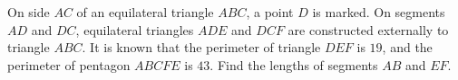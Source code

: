 On side $AC$ of an equilateral triangle $ABC$, a point $D$ is marked. On segments $AD$ and $DC$, equilateral triangles $ADE$ and $DCF$ are constructed externally to triangle $ABC$. It is known that the perimeter of triangle $DEF$ is $19$, and the perimeter of pentagon $ABCFE$ is $43$. Find the lengths of segments $AB$ and $EF$.
